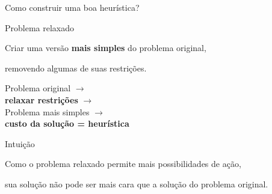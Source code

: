 \documentclass[xcolor=dvipsnames,table]{beamer}
\begin{document}
\begin{frame}[shrink]{Como construir uma boa heurística?}

    \begin{block}{Problema relaxado}

        Criar uma versão \textbf{mais simples} do problema original,

        removendo algumas de suas restrições.

    \end{block}

    \begin{center}

        \Large

        Problema original $\longrightarrow$ \\

        \textbf{relaxar restrições} $\longrightarrow$ \\

        Problema mais simples $\longrightarrow$ \\

        \textbf{custo da solução = heurística}

    \end{center}

    \begin{block}{Intuição}

        Como o problema relaxado permite mais possibilidades de ação,

        sua solução não pode ser mais cara que a solução do problema original.

    \end{block}

\end{frame}
	
	
	\begin{frame}
		\titlepage
	\end{frame}
	
\end{document}
